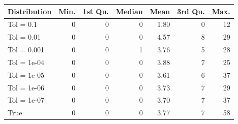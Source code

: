 \begin{figure} 
\begin{tabular}{lrrrrrr}
 Distribution & Min. & 1st Qu. & Median & Mean & 3rd Qu. & Max. \\ 
  \hline
\hline
Tol =  0.1 & 0 & 0 & 0 & 1.80 & 0 & 12 \\ 
  Tol =  0.01 & 0 & 0 & 0 & 4.57 & 8 & 29 \\ 
  Tol =  0.001 & 0 & 0 & 1 & 3.76 & 5 & 28 \\ 
  Tol =  1e-04 & 0 & 0 & 0 & 3.88 & 7 & 25 \\ 
  Tol =  1e-05 & 0 & 0 & 0 & 3.61 & 6 & 37 \\ 
  Tol =  1e-06 & 0 & 0 & 0 & 3.73 & 7 & 29 \\ 
  Tol =  1e-07 & 0 & 0 & 0 & 3.70 & 7 & 37 \\ 
  True & 0 & 0 & 0 & 3.77 & 7 & 58 \\ 
  \end{tabular}
\label{tab:SummaryTable}
\end{figure} 
